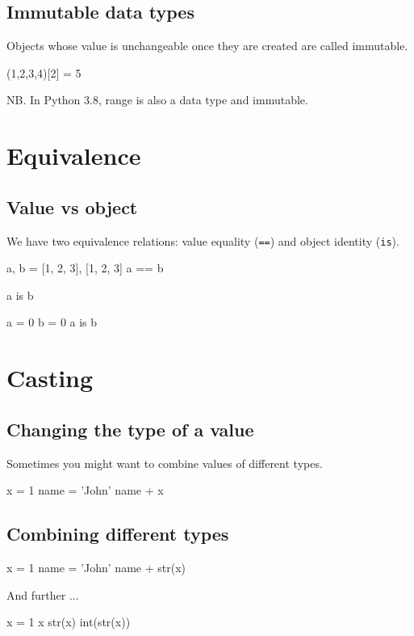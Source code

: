 \documentclass[aspectratio=1610,slidestop]{beamer}
\begin{document}
\subsection{Immutable data types}
\begin{pframe}
Objects whose value is unchangeable once they are created are called immutable.

\begin{pyconsole}
(1,2,3,4)[2] = 5
\end{pyconsole}
\medskip
\medskip
NB. In Python 3.8, range is also a data type and immutable.
\end{pframe}


\section{Equivalence}
\makeTableOfContentsSection

\subsection{Value vs object}
\begin{pframe}
We have two equivalence relations: value equality (\texttt{==}) and
object identity (\texttt{is}).
\begin{pyconsole}
a, b = [1, 2, 3], [1, 2, 3]
a == b

a is b

a = 0
b = 0
a is b

\end{pyconsole}
\end{pframe}


\section{Casting}
\subsection{Changing the type of a value}
\begin{pframe}
Sometimes you might want to combine values of different types.
\begin{pyconsole}
x = 1
name = 'John'
name + x
\end{pyconsole}
\end{pframe}


\subsection{Combining different types}
\begin{pframe}
\begin{pyconsole}
x = 1
name = 'John'
name + str(x)
\end{pyconsole}
\medskip
\medskip
And further ...
\begin{pyconsole}
x = 1
x
str(x)
int(str(x))
\end{pyconsole}
\end{pframe}
\end{document}
